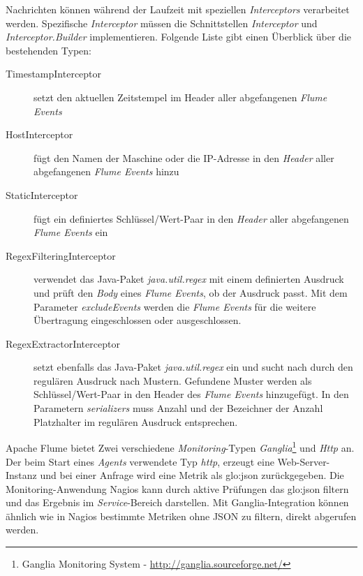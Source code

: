 Nachrichten können während der Laufzeit mit speziellen \textit{Interceptors} verarbeitet werden. Spezifische \textit{Interceptor} müssen die Schnittstellen \textit{Interceptor} und \textit{Interceptor.Builder} implementieren. Folgende Liste gibt einen Überblick über die bestehenden Typen:
\begin{description}
	\item[TimestampInterceptor] setzt den aktuellen Zeitstempel im Header aller abgefangenen \textit{Flume Events} 
	\item[HostInterceptor] fügt den Namen der Maschine oder die IP-Adresse in den \textit{Header} aller abgefangenen \textit{Flume Events} hinzu 
	\item[StaticInterceptor] fügt ein definiertes Schlüssel/Wert-Paar in den \textit{Header} aller abgefangenen \textit{Flume Events} ein 
	\item[RegexFilteringInterceptor] verwendet das Java-Paket \textit{java.util.regex} mit einem definierten Ausdruck und prüft den \textit{Body} eines \textit{Flume Events}, ob der Ausdruck passt. Mit dem Parameter \textit{excludeEvents} werden die \textit{Flume Events} für die weitere Übertragung eingeschlossen oder ausgeschlossen. 
	\item[RegexExtractorInterceptor] setzt ebenfalls das Java-Paket \textit{java.util.regex} ein und sucht nach durch den regulären Ausdruck nach Mustern. Gefundene Muster werden als Schlüssel/Wert-Paar in den Header des \textit{Flume Events} hinzugefügt. In den Parametern \textit{serializers} muss Anzahl und der Bezeichner der Anzahl Platzhalter im regulären Ausdruck entsprechen. 
\end{description}

Apache Flume bietet Zwei verschiedene \textit{Monitoring}-Typen \textit{Ganglia}\footnote{Ganglia Monitoring System - \url{http://ganglia.sourceforge.net/}} und \textit{Http} an. Der beim Start eines \textit{Agents} verwendete Typ \textit{http}, erzeugt eine Web-Server-Instanz und bei einer Anfrage wird eine Metrik als \gls{glo:json} zurückgegeben. Die Monitoring-Anwendung Nagios kann durch aktive Prüfungen das \gls{glo:json} filtern und das Ergebnis im \textit{Service}-Bereich darstellen. Mit Ganglia-Integration können ähnlich wie in Nagios bestimmte Metriken ohne JSON zu filtern, direkt abgerufen werden. 

